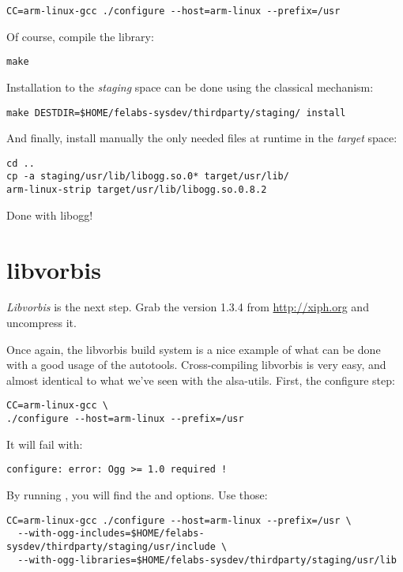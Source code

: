 \begin{verbatim}
CC=arm-linux-gcc ./configure --host=arm-linux --prefix=/usr
\end{verbatim}

Of course, compile the library:

\begin{verbatim}
make
\end{verbatim}

Installation to the {\em staging} space can be done using the
classical  mechanism:

\begin{verbatim}
make DESTDIR=$HOME/felabs-sysdev/thirdparty/staging/ install
\end{verbatim}

And finally, install manually the only needed files at runtime in the
{\em target} space:

\begin{verbatim}
cd ..
cp -a staging/usr/lib/libogg.so.0* target/usr/lib/
arm-linux-strip target/usr/lib/libogg.so.0.8.2
\end{verbatim}

Done with libogg!

\section{libvorbis}

{\em Libvorbis} is the next step. Grab the version 1.3.4 from
\url{http://xiph.org} and uncompress it.

Once again, the libvorbis build system is a nice example of what can
be done with a good usage of the autotools. Cross-compiling libvorbis
is very easy, and almost identical to what we've seen with the
alsa-utils. First, the configure step:

\begin{verbatim}
CC=arm-linux-gcc \
./configure --host=arm-linux --prefix=/usr
\end{verbatim}

It will fail with:

\begin{verbatim}
configure: error: Ogg >= 1.0 required !
\end{verbatim}

By running , you will find the
 and  options.
Use those:

\begin{verbatim}
CC=arm-linux-gcc ./configure --host=arm-linux --prefix=/usr \
  --with-ogg-includes=$HOME/felabs-sysdev/thirdparty/staging/usr/include \
  --with-ogg-libraries=$HOME/felabs-sysdev/thirdparty/staging/usr/lib
\end{verbatim}

